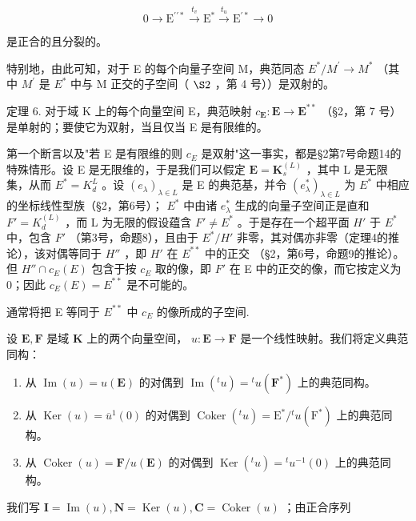 \[
0 \longrightarrow \mathrm{E} ^ {\prime \prime *} \stackrel {t _ {v}} {\longrightarrow} \mathrm{E} ^ {*} \stackrel {t _ {u}} {\longrightarrow} \mathrm{E} ^ {\prime *} \longrightarrow 0
\]

是正合的且分裂的。

特别地，由此可知，对于 E 的每个向量子空间 M，典范同态 \(E^{*}/M^{\prime} \rightarrow M^{*}\) （其中 \(M^{\prime}\) 是 \(E^{*}\) 中与 M 正交的子空间（ \(\S 2\) ，第 4 号））是双射的。

定理 6. 对于域 K 上的每个向量空间 E，典范映射 \(c_{\mathbf{E}}: \mathbf{E} \to \mathbf{E}^{**}\) （§2，第 7 号）是单射的；要使它为双射，当且仅当 E 是有限维的。

第一个断言以及"若 E 是有限维的则 \(c_{E}\) 是双射"这一事实，都是§2第7号命题14的特殊情形。设 E 是无限维的，于是我们可以假定 \(\mathbf{E} = \mathbf{K}_{s}^{(L)}\) ，其中 L 是无限集，从而 \(E^{*} = K_{d}^{L}\) 。设 \((e_{\lambda})_{\lambda \in L}\) 是 E 的典范基，并令 \((e_{\lambda}^{*})_{\lambda \in L}\) 为 \(E^{*}\) 中相应的坐标线性型族（§2，第6号）； \(E^{*}\) 中由诸 \(e_{\lambda}^{*}\) 生成的向量子空间正是直和 \(F' = K_{d}^{(L)}\) ，而 L 为无限的假设蕴含 \(F' \neq E^{*}\) 。于是存在一个超平面 \(H'\) 于 \(E^{*}\) 中，包含 \(F'\) （第3号，命题8），且由于 \(E^{*}/H'\) 非零，其对偶亦非零（定理4的推论），该对偶等同于 \(H''\) ，即 \(H'\) 在 \(E^{**}\) 中的正交 （§2，第6号，命题9的推论）。但 \(H'' \cap c_{E}(E)\) 包含于按 \(c_{E}\) 取的像，即 \(F'\) 在 E 中的正交的像，而它按定义为 0；因此 \(c_{E}(E) = E^{**}\) 是不可能的。

通常将把 E 等同于 \(E^{**}\) 中 \(c_{E}\) 的像所成的子空间.

设 \(\mathbf{E}, \mathbf{F}\) 是域 \(\mathbf{K}\) 上的两个向量空间， \(u: \mathbf{E} \to \mathbf{F}\) 是一个线性映射。我们将定义典范同构：

\begin{enumerate}
\def\labelenumi{(\arabic{enumi})}
\item
  从 \(\operatorname{Im}(u) = u(\mathbf{E})\) 的对偶到 \(\operatorname{Im}(^t u) = {}^t u(\mathbf{F}^*)\) 上的典范同构。
\item
  从 \(\operatorname{Ker}(u) = \overline{u}^1(0)\) 的对偶到 \(\operatorname{Coker}(^t u) = \mathrm{E}^* / {}^t u(\mathrm{F}^*)\) 上的典范同构。
\item
  从 \(\operatorname{Coker}(u) = \mathbf{F} / u(\mathbf{E})\) 的对偶到 \(\operatorname{Ker}(^t u) = {}^t u^{-1}(0)\) 上的典范同构。
\end{enumerate}

我们写 \(\mathbf{I} = \operatorname{Im}(u),\mathbf{N} = \operatorname{Ker}(u),\mathbf{C} = \operatorname{Coker}(u)\) ；由正合序列

